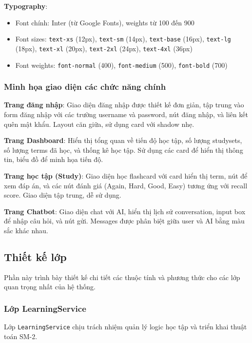 \documentclass[../DoAn.tex]{subfiles}
\begin{document}
\textbf{Typography}:
\begin{itemize}
    \item Font chính: Inter (từ Google Fonts), weights từ 100 đến 900
    \item Font sizes: \texttt{text-xs} (12px), \texttt{text-sm} (14px), \texttt{text-base} (16px), \texttt{text-lg} (18px), \texttt{text-xl} (20px), \texttt{text-2xl} (24px), \texttt{text-4xl} (36px)
    \item Font weights: \texttt{font-normal} (400), \texttt{font-medium} (500), \texttt{font-bold} (700)
\end{itemize}

\subsubsection{Minh họa giao diện các chức năng chính}

\textbf{Trang đăng nhập}: Giao diện đăng nhập được thiết kế đơn giản, tập trung vào form đăng nhập với các trường username và password, nút đăng nhập, và liên kết quên mật khẩu. Layout căn giữa, sử dụng card với shadow nhẹ.

\textbf{Trang Dashboard}: Hiển thị tổng quan về tiến độ học tập, số lượng studysets, số lượng terms đã học, và thống kê học tập. Sử dụng các card để hiển thị thông tin, biểu đồ để minh họa tiến độ.

\textbf{Trang học tập (Study)}: Giao diện học flashcard với card hiển thị term, nút để xem đáp án, và các nút đánh giá (Again, Hard, Good, Easy) tương ứng với recall score. Giao diện tập trung, dễ sử dụng.

\textbf{Trang Chatbot}: Giao diện chat với AI, hiển thị lịch sử conversation, input box để nhập câu hỏi, và nút gửi. Messages được phân biệt giữa user và AI bằng màu sắc khác nhau.

\subsection{Thiết kế lớp}
\label{subsection:4.2.2}

Phần này trình bày thiết kế chi tiết các thuộc tính và phương thức cho các lớp quan trọng nhất của hệ thống.

\subsubsection{Lớp LearningService}

Lớp \texttt{LearningService} chịu trách nhiệm quản lý logic học tập và triển khai thuật toán SM-2.
\end{document}
